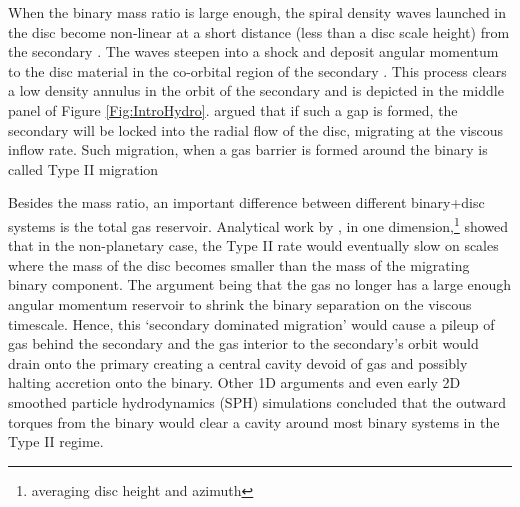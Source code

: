 When the binary mass ratio is large enough, the spiral density waves launched
in the disc become non-linear at a short distance (less than a disc scale
height) from the secondary \citep{GoodmanRafikov:2001}. The waves steepen into
a shock and deposit angular momentum to the disc material in the co-orbital
region of the secondary \citep[see Chapter \ref{ch:CBDTrans} and also][]{DongRafI:2011, DongRafII:2011, LinPapaI:1984,LinPapa86b,
LinPapaIII:1986}. This process clears a low density annulus in the orbit of
the secondary and is depicted in the middle panel of Figure
\ref{Fig:IntroHydro}. \cite{LinPapa86b} argued that if
such a gap is formed, the secondary will be locked into the radial flow of the
disc, migrating at the viscous inflow rate. Such migration, when a gas barrier
is formed around the binary is called Type II migration \citep[see also][and Chapter \ref{ch:CBDTrans}]{Ward:1997, KleyNelson:2012:rev}



Besides the mass ratio, an important difference between different binary+disc systems is the
total gas reservoir. Analytical work by \citep{SyerClarke95, Ivanov99}, in
one dimension,\footnote{averaging disc height and azimuth} showed that in the
non-planetary case, the Type II rate would eventually slow on scales where the
mass of the disc becomes smaller than the mass of the migrating binary
component. The argument being that the gas no longer has a large enough angular
momentum reservoir to shrink the binary separation on the viscous
timescale. Hence, this `secondary dominated migration' would cause a pileup of
gas behind the secondary and the gas interior to the secondary's orbit would
drain onto the primary creating a central cavity devoid of gas and possibly
halting accretion onto the binary. Other 1D arguments
\citep[][]{Milos:Phinney:2005} and even early 2D smoothed particle hydrodynamics
(SPH) simulations \citep{Artymowicz:1991} concluded that the outward torques
from the binary would clear a cavity around most binary systems in the Type II
regime.


